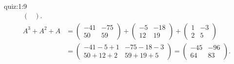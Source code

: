 \begin{answerof}{quiz:1:9}
\begin{align*}
\begin{pmatrix}
    \end{pmatrix}.
  \\%
    A^3+A^2+A&=
    \begin{pmatrix}
      -41&-75\\50&59
    \end{pmatrix}
    +
    \begin{pmatrix}
      -5&-18\\12&19
    \end{pmatrix}
    +
    \begin{pmatrix}
      1&-3\\2&5
    \end{pmatrix}\\
    &=
    \begin{pmatrix}
      -41-5+1&-75-18-3\\50+12+2&59+19+5
    \end{pmatrix}
    =
    \begin{pmatrix}
      -45&-96\\64&83
    \end{pmatrix}.    
  \end{align*}
\end{answerof}


